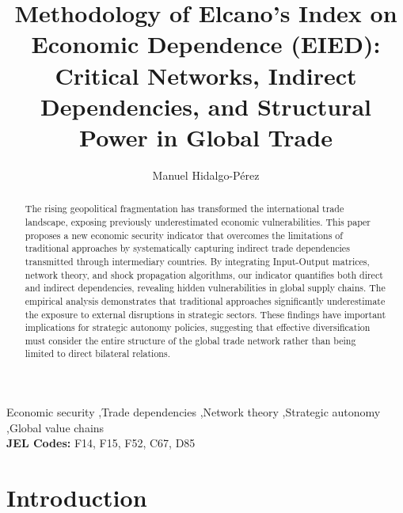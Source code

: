 \documentclass[final,1p,times,authoryear]{elsarticle}
\begin{document}
\begin{frontmatter}
\title{Methodology of Elcano's Index on Economic Dependence (EIED): Critical Networks, Indirect Dependencies, and Structural Power in Global Trade}

\author[upo,elcano]{Manuel Hidalgo-Pérez}



\begin{abstract}
The rising geopolitical fragmentation has transformed the international trade landscape, exposing previously underestimated economic vulnerabilities. This paper proposes a new economic security indicator that overcomes the limitations of traditional approaches by systematically capturing indirect trade dependencies transmitted through intermediary countries. By integrating Input-Output matrices, network theory, and shock propagation algorithms, our indicator quantifies both direct and indirect dependencies, revealing hidden vulnerabilities in global supply chains. The empirical analysis demonstrates that traditional approaches significantly underestimate the exposure to external disruptions in strategic sectors. These findings have important implications for strategic autonomy policies, suggesting that effective diversification must consider the entire structure of the global trade network rather than being limited to direct bilateral relations.
\end{abstract}

\begin{keyword}
Economic security \sep Trade dependencies \sep Network theory \sep Strategic autonomy \sep Global value chains\\
\textbf{JEL Codes:} F14, F15, F52, C67, D85
\end{keyword}
\end{frontmatter}

\section{Introduction}
\end{document}
